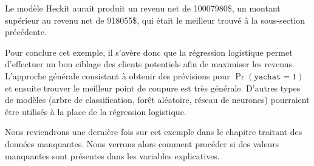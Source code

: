 \documentclass[
  11pt,
  letterpaper,
]{scrbook}
\newenvironment{Shaded}{\begin{snugshade}}{\end{snugshade}}
\newcommand{\AttributeTok}[1]{\textcolor[rgb]{0.40,0.45,0.13}{#1}}
\newcommand{\CommentTok}[1]{\textcolor[rgb]{0.37,0.37,0.37}{#1}}
\newcommand{\DecValTok}[1]{\textcolor[rgb]{0.68,0.00,0.00}{#1}}
\newcommand{\FunctionTok}[1]{\textcolor[rgb]{0.28,0.35,0.67}{#1}}
\newcommand{\NormalTok}[1]{\textcolor[rgb]{0.00,0.23,0.31}{#1}}
\newcommand{\OtherTok}[1]{\textcolor[rgb]{0.00,0.23,0.31}{#1}}
\newcommand{\SpecialCharTok}[1]{\textcolor[rgb]{0.37,0.37,0.37}{#1}}
\newcommand{\StringTok}[1]{\textcolor[rgb]{0.13,0.47,0.30}{#1}}
\theoremstyle{definition}
\theoremstyle{remark}
\begin{document}
\begin{Shaded}
\end{Shaded}

\begin{table}

\end{table}

Le modèle Heckit aurait produit un revenu net de 10007980\$, un montant
supérieur au revenu net de 918055\$, qui était le meilleur trouvé à la
sous-section précédente.

Pour conclure cet exemple, il s'avère donc que la régression logistique
permet d'effectuer un bon ciblage des clients potentiels afin de
maximiser les revenus. L'approche générale consistant à obtenir des
prévisions pour \(\Pr(\texttt{yachat}=1)\) et ensuite trouver le
meilleur point de coupure est très générale. D'autres types de modèles
(arbre de classification, forêt aléatoire, réseau de neurones)
pourraient être utilisés à la place de la régression logistique.

Nous reviendrons une dernière fois sur cet exemple dans le chapitre
traitant des données manquantes. Nous verrons alors comment procéder si
des valeurs manquantes sont présentes dans les variables explicatives.
\end{document}
